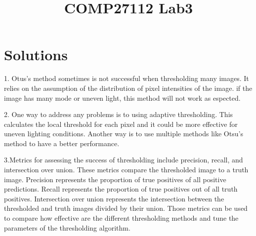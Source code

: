 \documentclass[a4]{article}
\title{COMP27112 Lab3}
\author{}
\begin{document}
\maketitle

\section{Solutions}
1. Otus's method sometimes is not successful when thresholding many images. It relies on the assumption of the distribution of pixel intensities of the image. if the image has many mode or uneven light, this method will not work as espected.

2. One way to address any problems is to using adaptive thresholding. This calculates the local threshold for each pixel and it could be more effective for uneven lighting conditions. Another way is to use multiple methods like Otsu's method to have a better performance.

3.Metrics for assessing the success of thresholding include precision, recall, and intersection over union. These metrics compare the thresholded image to a truth image. Precision represents the proportion of true positives of all positive predictions. Recall represents the proportion of true positives out of all truth positives. Intersection over union represents the intersection between the thresholded and truth images divided by their union. Those metrics can be used to compare how effective are the different thresholding methods and tune the parameters of the thresholding algorithm.
	
	





 


\appendix

\end{document}

